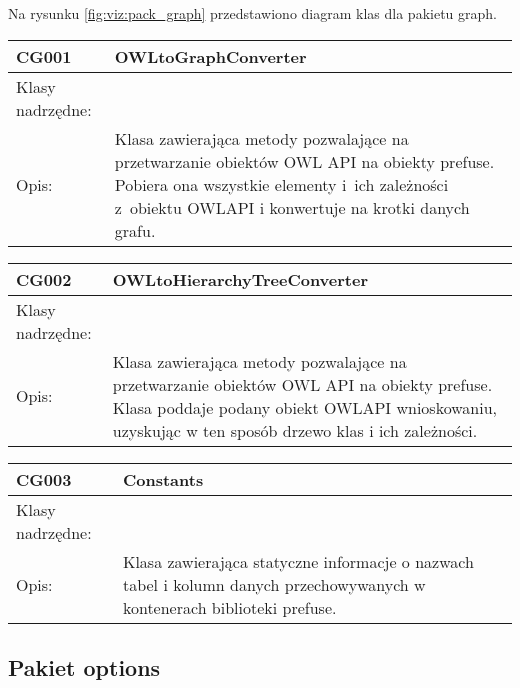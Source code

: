Na rysunku  \figurename \space \ref{fig:viz:pack_graph}  przedstawiono diagram klas dla pakietu graph.

\begin{center}
 


\begin{longtable}{|m{3.5cm}|m{8.5cm}|} \hline

CG001 & OWLtoGraphConverter \\ \hline
Klasy nadrzędne: &     \\ \hline
Opis: & Klasa zawierająca metody pozwalające na przetwarzanie obiektów OWL API na obiekty prefuse. Pobiera ona wszystkie elementy i~ich zależności
z~obiektu OWLAPI i konwertuje na krotki danych grafu. \\ \hline

\end{longtable}

\begin{longtable}{|m{3.5cm}|m{8.5cm}|} \hline


CG002 & OWLtoHierarchyTreeConverter \\ \hline
Klasy nadrzędne: &     \\ \hline
Opis: & Klasa zawierająca metody pozwalające na przetwarzanie obiektów OWL API na obiekty prefuse. Klasa poddaje podany obiekt OWLAPI wnioskowaniu, 
uzyskując w ten sposób drzewo klas i ich zależności.  \\ \hline

\end{longtable}

\begin{longtable}{|m{3.5cm}|m{8.5cm}|} \hline

CG003 & Constants \\ \hline
Klasy nadrzędne: &     \\ \hline
Opis: & Klasa zawierająca statyczne informacje o nazwach tabel i kolumn danych przechowywanych w kontenerach biblioteki prefuse. \\ \hline


\end{longtable}

\end{center}
\newpage
\subsection*{Pakiet options}


